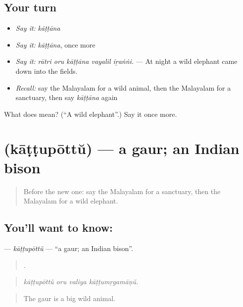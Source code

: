 \subsection*{Your turn}
\begin{itemize}
\raggedright
  \item \emph{Say it:} \emph{kāṭṭāna}
  \item \emph{Say it:} \emph{kāṭṭāna}, once more
  \item \emph{Say it:} \emph{rātri oru kāṭṭāna vayalil iṟaṅṅi.} — At night a wild elephant came down into the fields.
  \item \emph{Recall:} say the Malayalam for a wild animal, then the Malayalam for a sanctuary, then say \emph{kāṭṭāna} again
\end{itemize}

\begin{tcolorbox}[breakable,colback=teal!4,colframe=teal!35!black,title={Before you move on}]
What does  mean? (\textquotedblleft{}A wild elephant\textquotedblright{}.) Say it once more.
\end{tcolorbox}
\section[\texorpdfstring{\ml{കാട്ടുപോത്ത്} (kāṭṭupōttŭ)}{കാട്ടുപോത്ത് (kāṭṭupōttŭ)}]{ (kāṭṭupōttŭ) — a gaur; an Indian bison}

\label{lesson:ML-C499-kattupottu}



\begin{quote}
Before the new one: say the Malayalam for a sanctuary, then the Malayalam for a wild elephant.
\end{quote}

\subsection*{You'll want to know: }
\textbf{} — \emph{kāṭṭupōttŭ} — \textquotedblleft{}a gaur; an Indian bison\textquotedblright{}.

\begin{quote}
   .
\end{quote}

\begin{quote}
\emph{kāṭṭupōttŭ oru valiya kāṭṭumṛgamāṇŭ.}
\end{quote}

\begin{quote}
The gaur is a big wild animal.
\end{quote}

